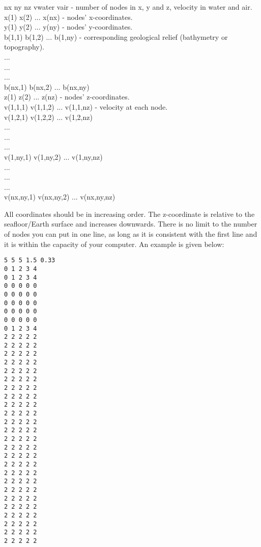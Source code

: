 \documentclass[twoside,final,onecolumn]{article}
\begin{document}
\begin{framed}
\noindent nx ny nz vwater vair \qquad\qquad- number of nodes in x, y and z, velocity in water and air. \\
x(1) x(2) ... x(nx) \qquad\qquad\hphantom{no}- nodes' x-coordinates.\\
y(1) y(2) ... y(ny) \qquad\qquad\hphantom{no}- nodes' y-coordinates.\\
b(1,1) b(1,2) ... b(1,ny) \qquad\hphantom{no}- corresponding geological relief (bathymetry or topography).\\
.\hphantom{b(1,1)---}.\hphantom{b(1,2)------}.\\
.\hphantom{b(1,1)---}.\hphantom{b(1,2)------}.\\
.\hphantom{b(1,1)---}.\hphantom{b(1,2)------}.\\
b(nx,1) b(nx,2) ... b(nx,ny)\\
z(1) z(2) ... z(nz) \qquad\qquad\qquad\hphantom{n}- nodes' z-coordinates.\\
v(1,1,1) v(1,1,2) ... v(1,1,nz) \qquad- velocity at each node.\\
v(1,2,1) v(1,2,2) ... v(1,2,nz)\\
.\hphantom{v(1,2,1)---}.\hphantom{v(1,2,2)----}.\\
.\hphantom{v(1,2,1)---}.\hphantom{v(1,2,2)----}.\\
.\hphantom{v(1,2,1)---}.\hphantom{v(1,2,2)----}.\\
v(1,ny,1) v(1,ny,2) ... v(1,ny,nz)\\
.\hphantom{v(1,ny,1)---}.\hphantom{v(1,ny,nz)----}.\\
.\hphantom{v(1,ny,1)---}.\hphantom{v(1,ny,nz)----}.\\
.\hphantom{v(1,ny,1)---}.\hphantom{v(1,ny,nz)----}.\\
v(nx,ny,1) v(nx,ny,2) ... v(nx,ny,nz)
\end{framed}

All coordinates should be in increasing order. The z-coordinate is relative to the seafloor/Earth surface and increases downwards.
There is no limit to the number of nodes you can put in one line, as long as it is consistent with the first line and it is within the capacity of your computer.
An example is given below:

\begin{verbatim}
5 5 5 1.5 0.33 
0 1 2 3 4
0 1 2 3 4
0 0 0 0 0
0 0 0 0 0
0 0 0 0 0
0 0 0 0 0
0 0 0 0 0
0 1 2 3 4
2 2 2 2 2
2 2 2 2 2
2 2 2 2 2
2 2 2 2 2
2 2 2 2 2
2 2 2 2 2
2 2 2 2 2
2 2 2 2 2
2 2 2 2 2
2 2 2 2 2
2 2 2 2 2
2 2 2 2 2
2 2 2 2 2
2 2 2 2 2
2 2 2 2 2
2 2 2 2 2
2 2 2 2 2
2 2 2 2 2
2 2 2 2 2
2 2 2 2 2
2 2 2 2 2
2 2 2 2 2
2 2 2 2 2
2 2 2 2 2
2 2 2 2 2 
\end{verbatim}
\end{document}
